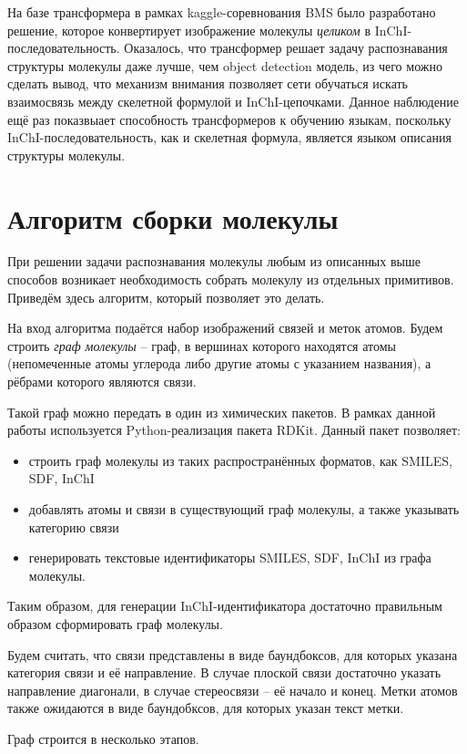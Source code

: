На базе трансформера в рамках kaggle-соревнования BMS \cite{bms} было разработано решение, которое конвертирует изображение молекулы \textit{целиком} в InChI-последовательность. Оказалось, что трансформер решает задачу распознавания структуры молекулы даже лучше, чем object detection модель, из чего можно сделать вывод, что механизм внимания позволяет сети обучаться искать взаимосвязь между скелетной формулой и InChI-цепочками. Данное наблюдение ещё раз показвыает способность трансформеров к обучению языкам, поскольку InChI-последовательность, как и скелетная формула, является языком описания структуры молекулы.


\section{Алгоритм сборки молекулы} \label{ch1:sec5}
При решении задачи распознавания молекулы любым из описанных выше способов возникает необходимость собрать молекулу из отдельных примитивов. Приведём здесь алгоритм, который позволяет это делать.

На вход алгоритма подаётся набор изображений связей и меток атомов. Будем строить \textit{граф молекулы} -- граф, в вершинах которого находятся атомы (непомеченные атомы углерода либо другие атомы с указанием названия), а рёбрами которого являются связи.

Такой граф можно передать в один из химических пакетов. В рамках данной работы используется Python-реализация пакета RDKit. Данный пакет позволяет:
\begin{itemize}
	\item строить граф молекулы из таких распространённых форматов, как SMILES, SDF, InChI
	\item добавлять атомы и связи в существующий граф молекулы, а также указывать категорию связи
	\item генерировать текстовые идентификаторы SMILES, SDF, InChI из графа молекулы.
\end{itemize}

Таким образом, для генерации InChI-идентификатора достаточно правильным образом сформировать граф молекулы.

Будем считать, что связи представлены в виде баундбоксов, для которых указана категория связи и её направление. В случае плоской связи достаточно указать направление диагонали, в случае стереосвязи -- её начало и конец. Метки атомов также ожидаются в виде баундобксов, для которых указан текст метки.

Граф строится в несколько этапов.

